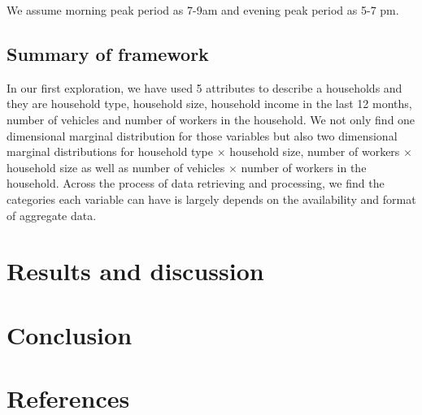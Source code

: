 \documentclass[11pt,twoside]{article}
\numberwithin{equation}{section}
\newcommand{\?}{\stackrel{?}{=}}
\begin{document}
We assume morning peak period as 7-9am and evening peak period as 5-7 pm.

\subsection{Summary of framework}
In our first exploration, we have used 5 attributes to describe a households and they are household type, household size, household income in the last 12 months, number of vehicles and number of workers in the household. We not only find one dimensional marginal distribution for those variables but also two dimensional marginal distributions for household type $\times$ household size, number of workers $\times$ household size as well as number of vehicles $\times$ number of workers in the household. Across the process of data retrieving and processing, we find the categories each variable can have is largely depends on the availability and format of aggregate data.




\section{Results and discussion}



\section{Conclusion}
\section{References}
\printbibliography

\appendix
\end{document}
